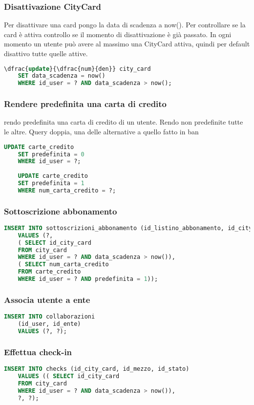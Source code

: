 \subsubsection{Disattivazione CityCard}
Per disattivare una card pongo la data di scadenza a now().
Per controllare se la card è attiva controllo se il momento di disattivazione è già passato.
In ogni momento un utente può avere al massimo una CityCard attiva,
quindi per default disattivo tutte quelle attive.
\begin{lstlisting}[language=SQL]
	\dfrac{update}{\dfrac{num}{den}} city_card
	SET data_scadenza = now()
	WHERE id_user = ? AND data_scadenza > now();
\end{lstlisting}

\subsubsection{Rendere predefinita una carta di credito}
rendo predefinita una carta di credito di un utente. Rendo non predefinite tutte le altre. Query doppia, una delle alternative a quello fatto in ban
\begin{lstlisting}[language=SQL]
	UPDATE carte_credito
	SET predefinita = 0
	WHERE id_user = ?;
	
	UPDATE carte_credito
	SET predefinita = 1
	WHERE num_carta_credito = ?;
\end{lstlisting}

\subsubsection{Sottoscrizione abbonamento}
\begin{lstlisting}[language=SQL]
	INSERT INTO sottoscrizioni_abbonamento (id_listino_abbonamento, id_city_card, num_carta_credito) 
	VALUES (?, 
	( SELECT id_city_card
	FROM city_card
	WHERE id_user = ? AND data_scadenza > now()), 
	( SELECT num_carta_credito 
	FROM carte_credito
	WHERE id_user = ? AND predefinita = 1));
\end{lstlisting}

\subsubsection{Associa utente a ente}
\begin{lstlisting}[language=SQL]
	INSERT INTO collaborazioni 
	(id_user, id_ente) 
	VALUES (?, ?);
\end{lstlisting}

\subsubsection{Effettua check-in}
\begin{lstlisting}[language=SQL]
	INSERT INTO checks (id_city_card, id_mezzo, id_stato) 
	VALUES (( SELECT id_city_card
	FROM city_card
	WHERE id_user = ? AND data_scadenza > now()), 
	?, ?);
\end{lstlisting}

